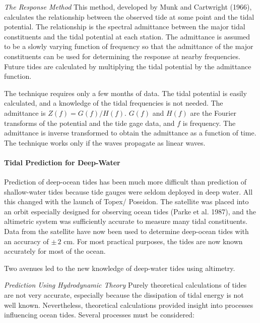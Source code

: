 \textit{The Response Method} This
method, developed by Munk and Cartwright (1966), calculates the relationship between the
observed tide at some point and the tidal potential. The relationship is the spectral
admittance between the major tidal constituents and the tidal potential at each station. The
admittance is assumed to be a slowly varying function of frequency so that the admittance of
the major constituents can be used for determining the response at nearby frequencies. Future
tides are calculated by multiplying the tidal potential by the admittance function.
\begin{enumerate}
\vitem
The technique requires only a few months of data.
\vitem
The tidal potential is easily calculated, and a knowledge of the tidal frequencies
is not needed.
\vitem
The admittance is $Z(f) = G(f)/H(f)$. $G(f)$ and $H(f)$ are the Fourier transforms
of the potential and the tide gage data, and $f$ is frequency.
\vitem
The admittance is inverse transformed to obtain the admittance as a function
of time.
\vitem
The technique works only if the waves propagate as linear waves.
\end{enumerate}

\paragraph{Tidal Prediction for Deep-Water}
Prediction of deep-ocean tides has been much more difficult than prediction of shallow-water tides because tide gauges were seldom deployed in deep water. All this changed with the launch of Topex/ Poseidon. The satellite was placed into an
orbit especially designed for observing ocean tides (Parke et al. 1987), and the altimetric
system was sufficiently accurate to measure many tidal constituents.
Data from the satellite have now been used to determine deep-ocean tides with an
accuracy of $\pm \, 2$ cm. For most practical purposes, the tides are
now known accurately for most of the ocean.

Two avenues led to the new knowledge of deep-water tides using altimetry.

\textit{Prediction Using Hydrodynamic Theory} Purely theoretical calculations of
 tides are not very accurate, especially
because the dissipation of tidal energy is not well known. Nevertheless, theoretical
calculations provided insight into processes influencing ocean tides. Several processes must be
considered:

